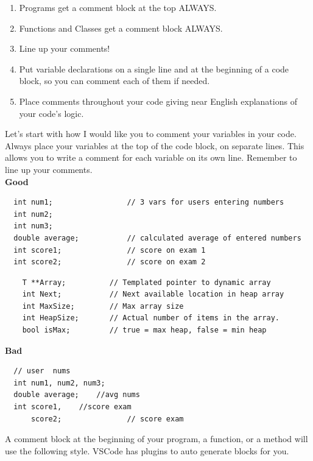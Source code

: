 \begin{enumerate}
    \item Programs get a comment block at the top ALWAYS.
    \item Functions and Classes get a comment block ALWAYS.
    \item Line up your comments!
    \item Put variable declarations on a single line and at the beginning of a code block, so you can comment each of them if needed.
    \item Place comments throughout your code giving near English explanations of your code's logic.
\end{enumerate}



Let's start with how I would like you to comment your variables in your code. Always place your variables at the top of the code block, on separate lines. This allows you to write a comment for each variable on its own line. Remember to line up your comments. \\
\textbf{Good}\\
\begin{verbatim}
  int num1;                 // 3 vars for users entering numbers
  int num2;
  int num3;     
  double average;           // calculated average of entered numbers
  int score1;               // score on exam 1
  int score2;               // score on exam 2
\end{verbatim}

\begin{verbatim}
    T **Array;          // Templated pointer to dynamic array
    int Next;           // Next available location in heap array
    int MaxSize;        // Max array size
    int HeapSize;       // Actual number of items in the array.
    bool isMax;         // true = max heap, false = min heap
\end{verbatim}

\textbf{Bad}\\
\begin{verbatim}
  // user  nums
  int num1, num2, num3;          
  double average;    //avg nums
  int score1,    //score exam
      score2;			    // score exam
\end{verbatim}


A comment block at the beginning of your program, a function, or a method will use the following style. VSCode has plugins to auto generate blocks for you. 

